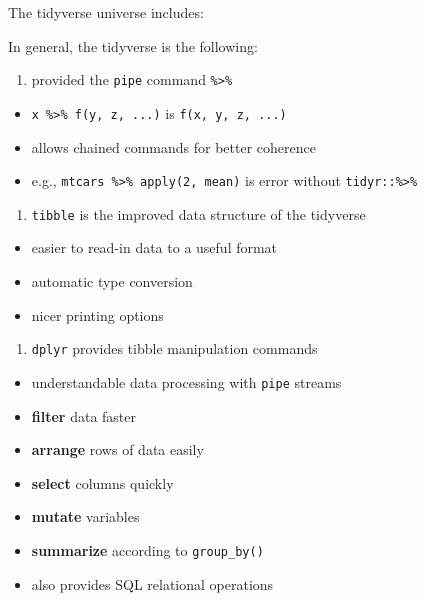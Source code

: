 \documentclass[]{book}
\providecommand{\tightlist}{%
  \setlength{\itemsep}{0pt}\setlength{\parskip}{0pt}}
\begin{document}
The tidyverse universe includes:

In general, the tidyverse is the following:

\begin{enumerate}
\def\labelenumi{\arabic{enumi}.}
\tightlist
\item
  provided the \texttt{pipe} command \texttt{\%\textgreater{}\%}
\end{enumerate}

\begin{itemize}
\tightlist
\item
  \texttt{x\ \%\textgreater{}\%\ f(y,\ z,\ ...)} is
  \texttt{f(x,\ y,\ z,\ ...)}
\item
  allows chained commands for better coherence
\item
  e.g., \texttt{mtcars\ \%\textgreater{}\%\ apply(2,\ mean)} is error
  without \texttt{tidyr::\%\textgreater{}\%}
\end{itemize}

\begin{enumerate}
\def\labelenumi{\arabic{enumi}.}
\setcounter{enumi}{1}
\tightlist
\item
  \texttt{tibble} is the improved data structure of the tidyverse
\end{enumerate}

\begin{itemize}
\tightlist
\item
  easier to read-in data to a useful format
\item
  automatic type conversion
\item
  nicer printing options
\end{itemize}

\begin{enumerate}
\def\labelenumi{\arabic{enumi}.}
\setcounter{enumi}{2}
\tightlist
\item
  \texttt{dplyr} provides tibble manipulation commands
\end{enumerate}

\begin{itemize}
\tightlist
\item
  understandable data processing with \texttt{pipe} streams
\item
  \textbf{filter} data faster
\item
  \textbf{arrange} rows of data easily
\item
  \textbf{select} columns quickly
\item
  \textbf{mutate} variables
\item
  \textbf{summarize} according to \texttt{group\_by()}
\item
  also provides SQL relational operations
\end{itemize}
\end{document}
